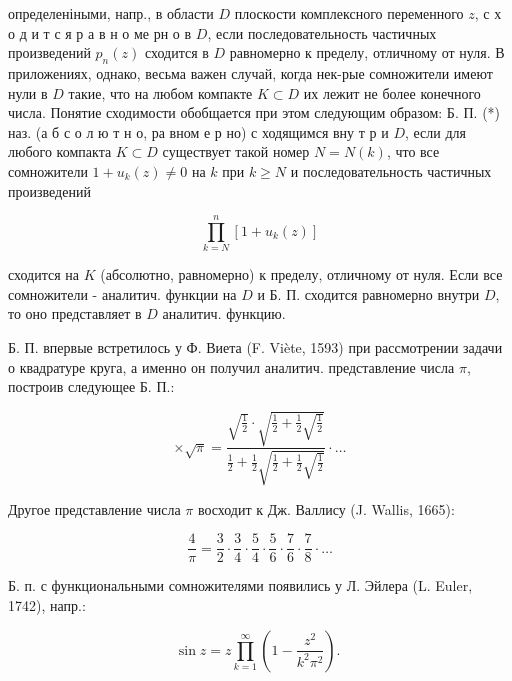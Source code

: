 \documentclass[10pt]{article}
\begin{document}
определеніными, напр., в области $D$ плоскости комплексного переменного $z$, с х о д и т с я р а в н о ме рн о в $D$, если последовательность частичных произведений $p_{n}(z)$ сходится в $D$ равномерно к пределу, отличному от нуля. В приложениях, однако, весьма важен случай, когда нек-рые сомножители имеют нули в $D$ такие, что на любом компакте $K \subset D$ их лежит не более конечного числа. Понятие сходимости обобщается при этом следующим образом: Б. П. (*) наз. (а б с о л ю т н о, ра вном е р но) с ходящимся вну т р и $D$, если для любого компакта $K \subset D$ существует такой номер $N=N(k)$, что все сомножители $1+u_{k}(z) \neq 0$ на $k$ при $k \geqslant N$ и последовательность частичных произведений



\[

\prod_{k=N}^{n}\left[1+u_{k}(z)\right]

\]



сходится на $K$ (абсолютно, равномерно) к пределу, отличному от нуля. Если все сомножители - аналитич. функции на $D$ и Б. П. сходится равномерно внутри $D$, то оно представляет в $D$ аналитич. функцию.



Б. П. впервые встретилось у Ф. Виета (F. Viète, 1593) при рассмотрении задачи о квадратуре круга, а именно он получил аналитич. представление числа $\pi$, построив следующее Б. П.:



\[

\times \sqrt{\pi}=\frac{\sqrt{\frac{1}{2}} \cdot \sqrt{\frac{1}{2}+\frac{1}{2} \sqrt{\frac{1}{2}}}}{\frac{1}{2}+\frac{1}{2} \sqrt{\frac{1}{2}+\frac{1}{2} \sqrt{\frac{1}{2}}}} \cdot \ldots

\]



Другое представление числа $\pi$ восходит к Дж. Валлису (J. Wallis, 1665):



\[

\frac{4}{\pi}=\frac{3}{2} \cdot \frac{3}{4} \cdot \frac{5}{4} \cdot \frac{5}{6} \cdot \frac{7}{6} \cdot \frac{7}{8} \cdot \ldots

\]



Б. п. с функциональными сомножителями появились у Л. Эйлера (L. Euler, 1742), напр.:



\[

\sin z=z \prod_{k=1}^{\infty}\left(1-\frac{z^{2}}{k^{2} \pi^{2}}\right) \text {. }

\]
\end{document}
